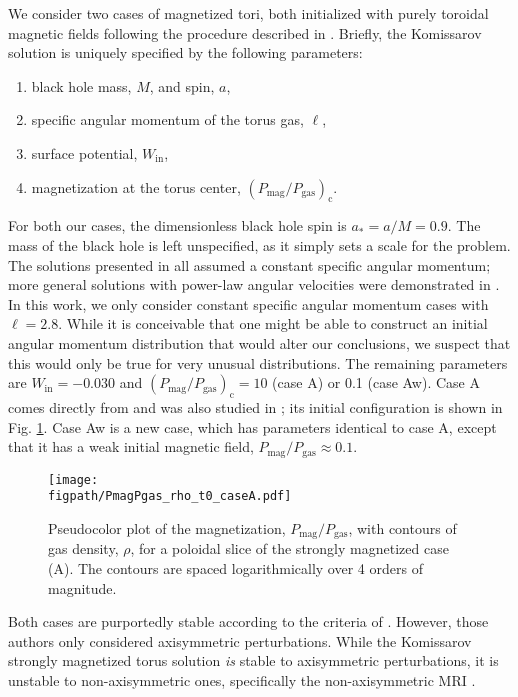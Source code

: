 \documentclass[useAMS,usenatbib]{mn2e}
\newcommand{\figpath}{.}
\def\pmpg{P_\mathrm{mag}/P_\mathrm{gas}}
\begin{document}
We consider two cases of magnetized tori, both initialized with purely toroidal magnetic fields following the procedure described in \citet{Komissarov06}.  Briefly, the Komissarov solution is uniquely specified by the following parameters:
\begin{enumerate}
\item black hole mass, $M$, and spin, $a$,
\item specific angular momentum of the torus gas, $\ell$,
\item surface potential, $W_\mathrm{in}$,
\item magnetization at the torus center, $(\pmpg)_\mathrm{c}$.
\end{enumerate}
For both our cases, the dimensionless black hole spin is $a_* = a/M = 0.9$.  The mass of the black hole is left unspecified, as it simply sets a scale for the problem.  The solutions presented in \citet{Komissarov06} all assumed a constant specific angular momentum; more general solutions with power-law angular velocities were demonstrated in \citet{Wielgus15}. In this work, we only consider constant specific angular momentum cases with $\ell = 2.8$.  While it is conceivable that one might be able to construct an initial angular momentum distribution that would alter our conclusions, we suspect that this would only be true for very unusual distributions. The remaining parameters are $W_\mathrm{in} = -0.030$ and $(\pmpg)_\mathrm{c} = 10$ (case A) or 0.1 (case Aw).  Case A comes directly from \citet{Komissarov06} and was also studied in \citet{Wielgus15}; its initial configuration is shown in Fig. \ref{fig:initial}.  Case Aw is a new case, which has parameters identical to case A, except that it has a weak initial magnetic field, $\pmpg \approx 0.1$. 

\begin{figure}
\centering
\texttt{[image: \\figpath/PmagPgas\_rho\_t0\_caseA.pdf]}
\caption{Pseudocolor plot of the magnetization, $P_\mathrm{mag}/P_\mathrm{gas}$, with contours of gas density, $\rho$, for a poloidal slice of the strongly magnetized case (A).  The contours are spaced logarithmically over 4 orders of magnitude.}
\label{fig:initial}
\end{figure}


Both cases are purportedly stable according to the criteria of \citet{Pessah05}.  However, those authors only considered axisymmetric perturbations.  While the Komissarov strongly magnetized torus solution {\em is} stable to axisymmetric perturbations, it is unstable to non-axisymmetric ones, specifically the non-axisymmetric MRI \citep{Wielgus15}.
\end{document}
